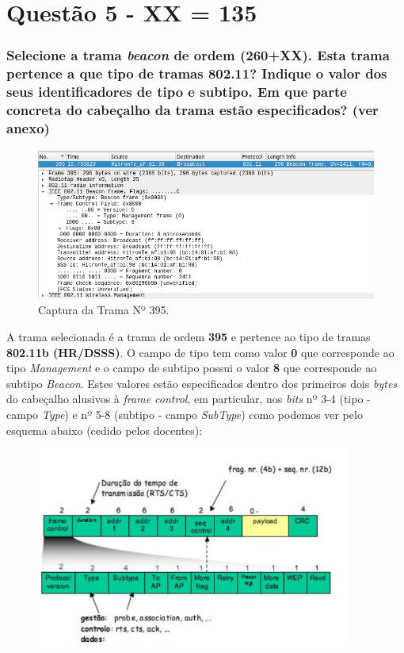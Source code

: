 

\section{Questão 5 - XX = 135} 


\subsubsection{Selecione a trama \textit{beacon} de ordem (260+XX). Esta trama pertence a que tipo de tramas 802.11? Indique o valor dos seus identificadores de tipo e subtipo. Em que parte concreta do cabeçalho da trama estão especificados? (ver anexo)}

    \begin{figure}[H]
    \centering
    \includegraphics[width=400pt]{Prints/Questao5/questao5-4-trama395.png}
    \caption{Captura da Trama Nº 395.} \label{questao5-1-trama395}
    \end{figure}
    
    
    \par A trama selecionada é a trama de ordem \textbf{395} e pertence ao tipo de tramas \textbf{802.11b (HR/DSSS)}. O campo de tipo tem como valor \textbf{0} que corresponde ao tipo \textit{Management} e o campo de subtipo possui o valor \textbf{8} que corresponde ao subtipo \textit{Beacon}. Estes valores estão especificados dentro dos primeiros dois \textit{bytes} do cabeçalho alusivos à \textit{frame control}, em particular, nos \textit{bits} nº 3-4 (tipo - campo \textit{Type}) e nº 5-8 (subtipo - campo \textit{SubType}) como podemos ver pelo esquema abaixo (cedido pelos docentes):

    \begin{figure}[H]
    \centering
    \includegraphics[width=295pt]{Prints/Questao5/stores-anexo.png}
    \label{questao5-1-stores}
    \end{figure}




